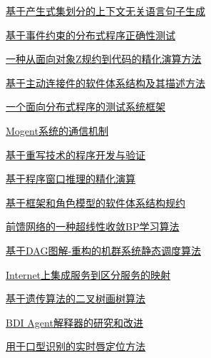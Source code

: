 \documentclass[a4paper]{article}
\begin{document}
\href{http://www.jos.org.cn/ch/reader/download_pdf.aspx?file_no=20000807&year_id=2000&quarter_id=8&falg=1}{基于产生式集划分的上下文无关语言句子生成}

\href{http://www.jos.org.cn/ch/reader/download_pdf.aspx?file_no=20000808&year_id=2000&quarter_id=8&falg=1}{基于事件约束的分布式程序正确性测试}

\href{http://www.jos.org.cn/ch/reader/download_pdf.aspx?file_no=20000809&year_id=2000&quarter_id=8&falg=1}{一种从面向对象Z规约到代码的精化演算方法}

\href{http://www.jos.org.cn/ch/reader/download_pdf.aspx?file_no=20000810&year_id=2000&quarter_id=8&falg=1}{基于主动连接件的软件体系结构及其描述方法}

\href{http://www.jos.org.cn/ch/reader/download_pdf.aspx?file_no=20000811&year_id=2000&quarter_id=8&falg=1}{一个面向分布式程序的测试系统框架}

\href{http://www.jos.org.cn/ch/reader/download_pdf.aspx?file_no=20000812&year_id=2000&quarter_id=8&falg=1}{Mogent系统的通信机制}

\href{http://www.jos.org.cn/ch/reader/download_pdf.aspx?file_no=20000813&year_id=2000&quarter_id=8&falg=1}{基于重写技术的程序开发与验证}

\href{http://www.jos.org.cn/ch/reader/download_pdf.aspx?file_no=20000814&year_id=2000&quarter_id=8&falg=1}{基于程序窗口推理的精化演算}

\href{http://www.jos.org.cn/ch/reader/download_pdf.aspx?file_no=20000815&year_id=2000&quarter_id=8&falg=1}{基于框架和角色模型的软件体系结构规约}

\href{http://www.jos.org.cn/ch/reader/download_pdf.aspx?file_no=20000817&year_id=2000&quarter_id=8&falg=1}{前馈网络的一种超线性收敛BP学习算法}

\href{http://www.jos.org.cn/ch/reader/download_pdf.aspx?file_no=20000818&year_id=2000&quarter_id=8&falg=1}{基于DAG图解-重构的机群系统静态调度算法}

\href{http://www.jos.org.cn/ch/reader/download_pdf.aspx?file_no=20000819&year_id=2000&quarter_id=8&falg=1}{Internet上集成服务到区分服务的映射}

\href{http://www.jos.org.cn/ch/reader/download_pdf.aspx?file_no=20000820&year_id=2000&quarter_id=8&falg=1}{基于遗传算法的二叉树画树算法}

\href{http://www.jos.org.cn/ch/reader/download_pdf.aspx?file_no=20000821&year_id=2000&quarter_id=8&falg=1}{BDI Agent解释器的研究和改进}

\href{http://www.jos.org.cn/ch/reader/download_pdf.aspx?file_no=20000822&year_id=2000&quarter_id=8&falg=1}{用于口型识别的实时唇定位方法}
\end{document}

